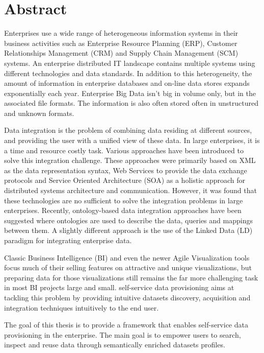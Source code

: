 \chapter*{Abstract}

Enterprises use a wide range of heterogeneous information systems in their business activities such as Enterprise Resource Planning (ERP), Customer Relationships Management (CRM) and Supply Chain Management (SCM) systems. An enterprise distributed IT landscape contains multiple systems using different technologies and data standards. In addition to this heterogeneity, the amount of information in enterprise databases and on-line data stores expands exponentially each year. Enterprise Big Data isn't big in volume only, but in the associated file formats. The information is also often stored often in unstructured and unknown formats.

Data integration is the problem of combining data residing at different sources, and providing the user with a unified view of these data. In large enterprises, it is a time and resource costly task. Various approaches have been introduced to solve this integration challenge. These approaches were primarily based on XML as the data representation syntax, Web Services to provide the data exchange protocols and Service Oriented Architecture (SOA) as a holistic approach for distributed systems architecture and communication. However, it was found that these technologies are no sufficient to solve the integration problems in large enterprises. Recently, ontology-based data integration approaches have been suggested where ontologies are used to describe the data, queries and mappings between them. A slightly different approach is the use of the Linked Data (LD) paradigm for integrating enterprise data.

Classic Business Intelligence (BI) and even the newer Agile Visualization tools focus much of their selling features on attractive and unique visualizations, but preparing data for those visualizations still remains the far more challenging task in most BI projects large and small. self-service data provisioning aims at tackling this problem by providing intuitive datasets discovery, acquisition and integration techniques intuitively to the end user.

The goal of this thesis is to provide a framework that enables self-service data provisioning in the enterprise. The main goal is to empower users to search, inspect and reuse data through semantically enriched datasets profiles.

